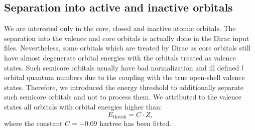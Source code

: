 \documentclass[12pt,openright,twoside,headsepline,bibtotoc]{scrbook}
\begin{document}
\subsection{Separation into active and inactive orbitals}

We are interested only in the core, closed and inactive atomic orbitals. The separation into the valence and core orbitals is actually done in the Dirac input files. Nevertheless, some orbitals which are treated by Dirac as core orbitals still have almost degenerate orbital energies with the orbitals treated as valence states. Such semicore orbitals usually have bad normalization and ill defined $l$ orbital quantum numbers due to the coupling with the true open-shell valence states. Therefore, we introduced the energy threshold to additionally separate such semicore orbitals and not to process them. We attributed to the valence states all orbitals with orbital energies higher than:
%
\begin{equation}
E_\textrm{thresh} = C \cdot Z ,
\end{equation}
%
where the constant $C = -0.09$ hartree has been fitted.


  
\end{document}
